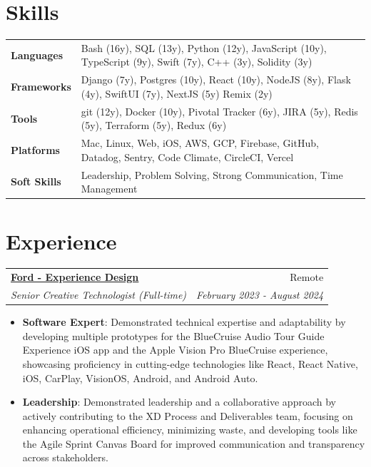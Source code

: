 \documentclass[a4paper,20pt]{article}
\makeatletter
\newcommand{\resumeItem}[2]{
  \item\small{
    \textbf{#1}{: #2 \vspace{-6pt}}
  }
}
\newcommand{\resumeSubheading}[4]{
  \vspace{-1pt}\item
    \begin{tabular*}{0.97\textwidth}{l@{\extracolsep{\fill}}r}
      \textbf{#1} & #2 \\
      \textit{#3} & \textit{#4} \\
    \end{tabular*}\vspace{-5pt}
}
\newcommand{\resumeItemListStart}{\begin{itemize}}
\newcommand{\resumeItemListEnd}{\end{itemize}\vspace{-3pt}}
\makeatother
\begin{document}
{\color{BurntOrange} \section{\textbf{Skills}}}
\begin{tabular}{p{3cm} p{24cm}}
\hspace{0.5cm}\textbf{Languages} & Bash (16y), SQL (13y), Python (12y), JavaScript (10y), TypeScript (9y), Swift (7y), C++ (3y), Solidity (3y) \\
  \hspace{0.5cm}\textbf{Frameworks} & Django (7y), Postgres (10y), React (10y), NodeJS (8y), Flask (4y), SwiftUI (7y), NextJS (5y) Remix (2y) \\
\hspace{0.5cm}\textbf{Tools} & git (12y), Docker (10y), Pivotal Tracker (6y), JIRA (5y), Redis (5y), Terraform (5y), Redux (6y) \\
\hspace{0.5cm}\textbf{Platforms} & Mac, Linux, Web, iOS, AWS, GCP, Firebase, GitHub, Datadog, Sentry, Code Climate, CircleCI, Vercel \\
\hspace{0.5cm}\textbf{Soft Skills} & Leadership, Problem Solving, Strong Communication, Time Management \\
\end{tabular}
\vspace{8pt}

{\color{ForestGreen} \section{\textbf{Experience}}}

  \resumeSubHeadingListStart

  \resumeSubheading{\underline{\href{http://ford.com}{Ford - Experience Design}}}{Remote}
    {Senior Creative Technologist (Full-time)}{February 2023 - August 2024}
    \resumeItemListStart
          \resumeItem{Software Expert}
          {Demonstrated technical expertise and adaptability by developing multiple prototypes for the BlueCruise Audio Tour Guide Experience iOS app and the Apple Vision Pro BlueCruise experience, showcasing proficiency in cutting-edge technologies like React, React Native, iOS, CarPlay, VisionOS, Android, and Android Auto.}
          \resumeItem{Leadership}
          {Demonstrated leadership and a collaborative approach by actively contributing to the XD Process and Deliverables team, focusing on enhancing operational efficiency, minimizing waste, and developing tools like the Agile Sprint Canvas Board for improved communication and transparency across stakeholders.}
          \resumeItemListEnd
\end{document}
